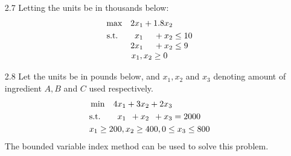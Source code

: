 \documentclass[a4paper,10pt]{article}
\theoremstyle{definition}
\begin{document}
\begin{enumerate}
\item[2.7]
Letting the units be in thousands below: 
\begin{align*}
  \begin{array}{r@{}r@{}l}
    \text{max} \quad 2x_1 &{}+ 1.8x_2 \\[\jot]
    \text{s.t.}\qquad x_1 &{}+ x_2&{} \leq 10 \\
    2x_1 &{}+ x_2&{} \leq 9 \\
     \multicolumn{3}{c}{x_1, x_2 \geq 0}
  \end{array}
\end{align*}
\item[2.8]
Let the units be in pounds below, and $x_1, x_2$ and $x_3$ denoting amount of ingredient $A, B$ and $C$ used respectively.
\begin{align*}
  \begin{array}{r@{}r@{}r@{}l}
    \text{min} \quad 4x_1 &{}+ 3x_2&{}+2x_3 \\[\jot]
    \text{s.t.}\qquad    x_1 &{}+ x_2&{}+x_3&{}=2000 \\[\jot]
     \multicolumn{4}{c}{x_1 \geq 200, x_2 \geq 400 , 0 \leq x_3 \leq 800}
  \end{array}
\end{align*}
The bounded variable index method can be used to solve this problem.


\end{enumerate}
\end{document}
